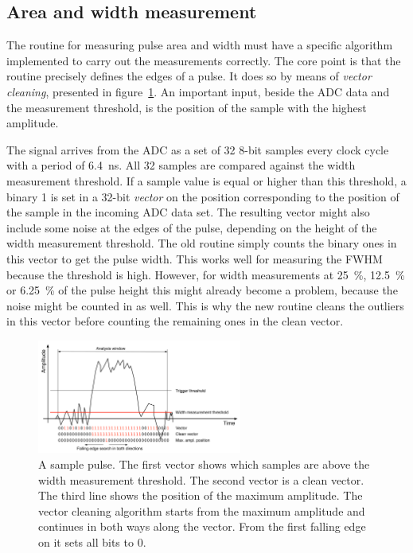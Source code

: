 \subsection{Area and width measurement}
\label{sec:vecclean}
The routine for measuring pulse area and width must have a specific algorithm implemented to carry out the measurements correctly. The core point is that the routine precisely defines the edges of a pulse. It does so by means of \emph{vector cleaning}, presented in figure~\ref{fig:samplepulse}. An important input, beside the ADC data and the measurement threshold, is the position of the sample with the highest amplitude. 

The signal arrives from the ADC as a set of 32 8-bit samples every clock cycle with a period of 6.4~ns. All 32 samples are compared against the width measurement threshold. If a sample value is equal or higher than this threshold, a binary 1 is set in a 32-bit \emph{vector} on the position corresponding to the position of the sample in the incoming ADC data set. The resulting vector might also include some noise at the edges of the pulse, depending on the height of the width measurement threshold. The old routine simply counts the binary ones in this vector to get the pulse width. This works well for measuring the FWHM because the threshold is high. However, for width measurements at 25~\%, 12.5~\% or 6.25~\% of the pulse height this might already become a problem, because the noise might be counted in as well. This is why the new routine cleans the outliers in this vector before counting the remaining ones in the clean vector. 

\begin{figure}[!t]
\centering
\includegraphics[width=0.6\textwidth]{05_current_monitoring/plots/pulse1}
\caption{A sample pulse. The first vector shows which samples are above the width measurement threshold. The second vector is a clean vector. The third line shows the position of the maximum amplitude. The vector cleaning algorithm starts from the maximum amplitude and continues in both ways along the vector. From the first falling edge on it sets all bits to 0.}
\label{fig:samplepulse}
\end{figure}

